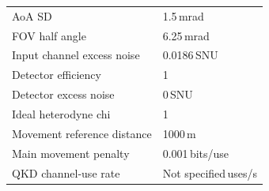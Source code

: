 \begin{table}[t]
\begin{tabular}{@{}p{}p{}@{}}
AoA SD & 1.5\,mrad \\
FOV half angle & 6.25\,mrad \\
Input channel excess noise & 0.0186\,SNU \\
Detector efficiency & 1 \\
Detector excess noise & 0\,SNU \\
Ideal heterodyne chi & 1 \\
Movement reference distance & 1000\,m \\
Main movement penalty & 0.001\,bits/use \\
QKD channel-use rate & Not specified\,uses/s \\
\hline\end{tabular}
\end{table}
